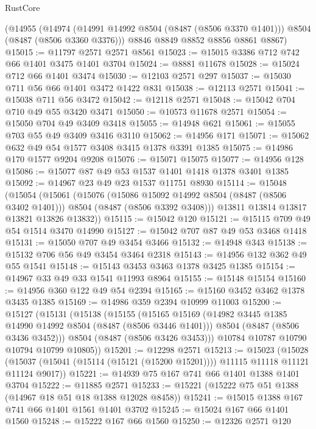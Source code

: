 \begin{lexlean}{RustCore}
\begin{coremodule}
    (@14955
      (@14974 (@14991 @14992 @8504 (@8487 (@8506 @3370 @1401))) @8504 (@8487 (@8506 @3360 @3376)))
      @8846
      @8849
      @8852
      @8856
      @8861
      @8867)
@15015 := @11797 @2571 @2571 @8561
@15023 := @15015 @3386 @712 @742 @66 @1401 @3475 @1401 @3704
@15024 := @8881 @11678
@15028 := @15024 @712 @66 @1401 @3474
@15030 := @12103 @2571 @297
@15037 := @15030 @711 @56 @66 @1401 @3472 @1422 @831
@15038 := @12113 @2571
@15041 := @15038 @711 @56 @3472
@15042 := @12118 @2571
@15048 := @15042 @704 @710 @49 @55 @3420 @3471
@15050 := @10573 @11678 @2571
@15054 := @15050 @704 @49 @3409 @3418
@15055 := @14948 @621
@15061 := @15055 @703 @55 @49 @3409 @3416 @3110
@15062 := @14956 @171
@15071 := @15062 @632 @49 @54 @1577 @3408 @3415 @1378 @3391 @1385
@15075 := @14986 @170 @1577 @9204 @9208
@15076 := @15071 @15075
@15077 := @14956 @128
@15086 := @15077 @87 @49 @53 @1537 @1401 @1418 @1378 @3401 @1385
@15092 := @14967 @23 @49 @23 @1537 @11751 @8930
@15114 := @15048
    (@15054
      (@15061
        (@15076
          (@15086 @15092 @14992 @8504 (@8487 (@8506 @3402 @1401)))
          @8504
          (@8487 (@8506 @3392 @3408)))
        @13811
        @13814
        @13817
        @13821
        @13826
        @13832))
@15115 := @15042 @120
@15121 := @15115 @709 @49 @54 @1514 @3470 @14990
@15127 := @15042 @707 @87 @49 @53 @3468 @1418
@15131 := @15050 @707 @49 @3454 @3466
@15132 := @14948 @343
@15138 := @15132 @706 @56 @49 @3454 @3464 @2318
@15143 := @14956 @132 @362 @49 @55 @1541
@15148 := @15143 @3453 @3463 @1378 @3425 @1385
@15154 := @14967 @33 @49 @33 @1541 @11993 @8964
@15155 := @15148 @15154
@15160 := @14956 @360 @122 @49 @54 @2394
@15165 := @15160 @3452 @3462 @1378 @3435 @1385
@15169 := @14986 @359 @2394 @10999 @11003
@15200 := @15127
    (@15131
      (@15138
        (@15155
          (@15165
            @15169
            (@14982 @3445 @1385 @14990 @14992 @8504 (@8487 (@8506 @3446 @1401)))
            @8504
            (@8487 (@8506 @3436 @3452)))
          @8504
          (@8487 (@8506 @3426 @3453)))
        @10784
        @10787
        @10790
        @10794
        @10799
        @10805))
@15201 := @12298 @2571
@15213 := @15023
    (@15028 (@15037 (@15041 (@15114 (@15121 (@15200 @15201)))) @11115 @11118 @11121 @11124 @9017))
@15221 := @14939 @75 @167 @741 @66 @1401 @1388 @1401 @3704
@15222 := @11885 @2571
@15233 := @15221 (@15222 @75 @51 @1388 (@14967 @18 @51 @18 @1388 @12028 @8458))
@15241 := @15015 @1388 @167 @741 @66 @1401 @1561 @1401 @3702
@15245 := @15024 @167 @66 @1401 @1560
@15248 := @15222 @167 @66 @1560
@15250 := @12326 @2571 @120

\end{coremodule}
\end{lexlean}
